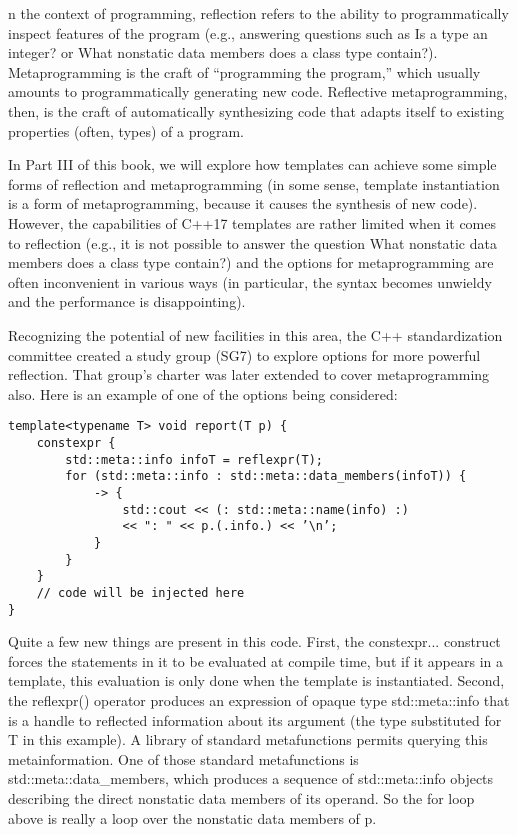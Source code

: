 n the context of programming, reflection refers to the ability to programmatically inspect features of the program (e.g., answering questions such as Is a type an integer? or What nonstatic data members does a class type contain?). Metaprogramming is the craft of “programming the program,” which usually amounts to programmatically generating new code. Reflective metaprogramming, then, is the craft of automatically synthesizing code that adapts itself to existing properties (often, types) of a program.

In Part III of this book, we will explore how templates can achieve some simple forms of reflection and metaprogramming (in some sense, template instantiation is a form of metaprogramming, because it causes the synthesis of new code). However, the capabilities of C++17 templates are rather limited when it comes to reflection (e.g., it is not possible to answer the question What nonstatic data members does a class type contain?) and the options for metaprogramming are often inconvenient in various ways (in particular, the syntax becomes unwieldy and the performance is disappointing).

Recognizing the potential of new facilities in this area, the C++ standardization committee created a study group (SG7) to explore options for more powerful reflection. That group’s charter was later extended to cover metaprogramming also. Here is an example of one of the options being considered:

\begin{lstlisting}[style=styleCXX]
template<typename T> void report(T p) {
	constexpr {
		std::meta::info infoT = reflexpr(T);
		for (std::meta::info : std::meta::data_members(infoT)) {
			-> {
				std::cout << (: std::meta::name(info) :)
				<< ": " << p.(.info.) << ’\n’;
			}
		}
	}
	// code will be injected here
}
\end{lstlisting}

Quite a few new things are present in this code. First, the constexpr{...} construct forces the statements in it to be evaluated at compile time, but if it appears in a template, this evaluation is only done when the template is instantiated. Second, the reflexpr() operator produces an expression of opaque type std::meta::info that is a handle to reflected information about its argument (the type substituted for T in this example). A library of standard metafunctions permits querying this metainformation. One of those standard metafunctions is std::meta::data\_members, which produces a sequence of std::meta::info objects describing the direct nonstatic data members of its operand. So the for loop above is really a loop over the nonstatic data members of p.

